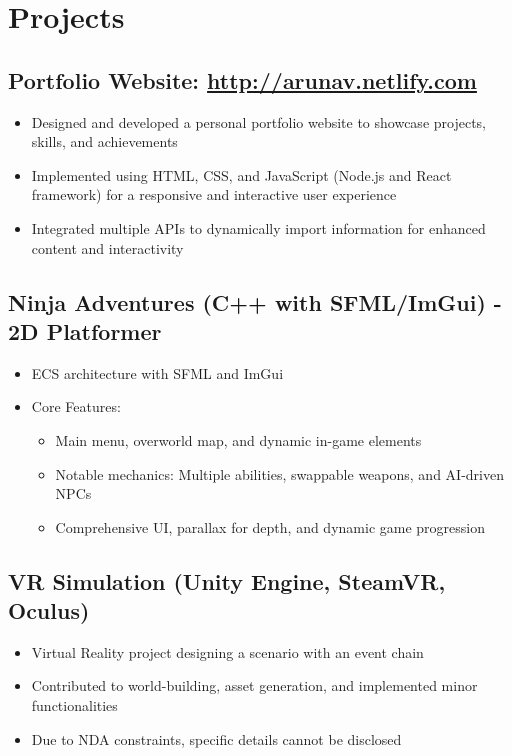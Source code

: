 \documentclass[10pt]{article}
\begin{document}
\section{Projects}
\subsection{Portfolio Website: \href{http://arunav.netlify.com}{http://arunav.netlify.com} \hfill }
\begin{itemize}
    \item Designed and developed a personal portfolio website to showcase projects, skills, and achievements
    \item Implemented using HTML, CSS, and JavaScript (Node.js and React framework) for a responsive and interactive user experience
    \item Integrated multiple APIs to dynamically import information for enhanced content and interactivity
\end{itemize}

\subsection{Ninja Adventures (C++ with SFML/ImGui) - 2D Platformer \hfill }
\begin{itemize}
    \item ECS architecture with SFML and ImGui
    \item Core Features:
    \begin{itemize}
        \item Main menu, overworld map, and dynamic in-game elements
        \item Notable mechanics: Multiple abilities, swappable weapons, and AI-driven NPCs
        \item Comprehensive UI, parallax for depth, and dynamic game progression
    \end{itemize}
\end{itemize}

\subsection{VR Simulation (Unity Engine, SteamVR, Oculus) \hfill }
\begin{itemize}
    \item Virtual Reality project designing a scenario with an event chain
    \item Contributed to world-building, asset generation, and implemented minor functionalities
    \item Due to NDA constraints, specific details cannot be disclosed
\end{itemize}
\end{document}
